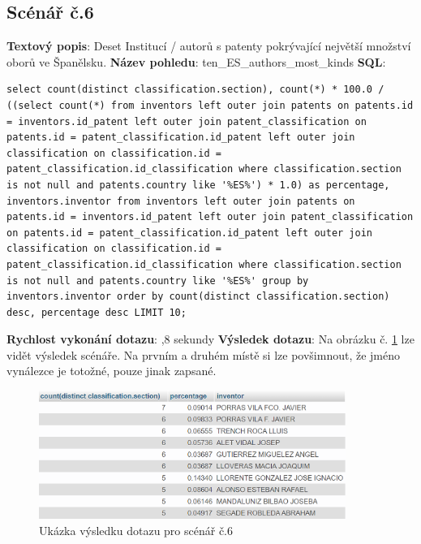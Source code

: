 \subsection{Scénář č.6}
\textbf{Textový popis}: Deset Institucí / autorů s patenty pokrývající největší množství oborů ve Španělsku.
\newline
\textbf{Název pohledu}: ten\_ES\_authors\_most\_kinds
\newline
\textbf{SQL}: 
\begin{lstlisting}[label = {lst:elements_a}]
select count(distinct classification.section), count(*) * 100.0 / ((select count(*) from inventors left outer join patents on patents.id = inventors.id_patent left outer join patent_classification on patents.id = patent_classification.id_patent left outer join classification on classification.id = patent_classification.id_classification where classification.section is not null and patents.country like '%ES%') * 1.0) as percentage, inventors.inventor from inventors left outer join patents on patents.id = inventors.id_patent left outer join patent_classification on patents.id = patent_classification.id_patent left outer join classification on classification.id = patent_classification.id_classification where classification.section is not null and patents.country like '%ES%' group by inventors.inventor order by count(distinct classification.section) desc, percentage desc LIMIT 10;
\end{lstlisting}
\textbf{Rychlost vykonání dotazu}: ,8 sekundy
\newline
\textbf{Výsledek dotazu}: Na obrázku č. \ref{fig:scenar6} lze vidět výsledek scénáře. Na prvním a druhém místě si lze povšimnout, že jméno vynálezce je totožné, pouze jinak zapsané.
\begin{figure}[H]
\centering
\includegraphics[width=10cm]{img/scenare/scenar_6}
\caption{Ukázka výsledku dotazu pro scénář č.6}
\label{fig:scenar6}
\end{figure}

\newpage
